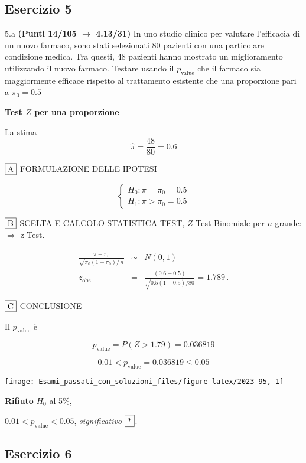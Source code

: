 \documentclass[
  11pt,
]{book}
\theoremstyle{mytheoremstyle}
\theoremstyle{mydefstyle}
\newenvironment{sol}
  {
  \begin{tcolorbox}[enhanced,breakable,arc=0.1mm,boxrule=1pt,colback=white,colframe=iblue,
  title=\bf \fontfamily{lmss}\selectfont \hspace{.5 cm} Soluzione,drop fuzzy shadow]

}{
\end{tcolorbox}
  }
\begin{document}
\subsection{Esercizio 5}\label{esercizio-5-30}

5.a \textbf{(Punti 14/105 \(\rightarrow\) 4.13/31)} In uno studio clinico per valutare l'efficacia di un nuovo farmaco, sono stati selezionati 80 pazienti con una particolare condizione medica. Tra questi, 48 pazienti hanno mostrato un miglioramento utilizzando il nuovo farmaco. Testare usando il \(p_\text{value}\) che il farmaco sia maggiormente efficace rispetto al trattamento esistente che una proporzione pari a \(\pi_0 = 0.5\)

\begin{sol}
\textbf{Test \(Z\) per una proporzione}

La stima
\[\hat\pi=\frac { 48 } { 80 }= 0.6  \]

\(\fbox{A}\) FORMULAZIONE DELLE IPOTESI

\[\begin{cases}
   H_0: \pi = \pi_0=0.5 \\
   H_1: \pi > \pi_0=0.5 
   \end{cases}\]

\(\fbox{B}\) SCELTA E CALCOLO STATISTICA-TEST, \(Z\)
Test Binomiale per \(n\) grande: \(\Rightarrow\) z-Test.

\begin{eqnarray*}
   \frac{\hat\pi - \pi_{0}} {\sqrt {\pi_0(1-\pi_0)/\,n}}&\sim&N(0,1)\\
   z_{\text{obs}}
   &=& \frac{ ( 0.6 -  0.5 )} {\sqrt{ 0.5 (1- 0.5 )/ 80 }}
   =   1.789 \,.
   \end{eqnarray*}

\(\fbox{C}\) CONCLUSIONE

Il \(p_{\text{value}}\) è

\[ p_{\text{value}} = P(Z>1.79)=0.036819 \]

\[
 0.01 < p_\text{value}= 0.036819 \leq 0.05 
\]

\begin{center}\texttt{[image: Esami\_passati\_con\_soluzioni\_files/figure-latex/2023-95,-1]} \end{center}

\textbf{Rifiuto} \(H_0\) al 5\%,

\(0.01<p_\text{value}<0.05\), \emph{significativo} \(\fbox{*}\).

\end{sol}

\subsection{Esercizio 6}\label{esercizio-6-29}
\end{document}
